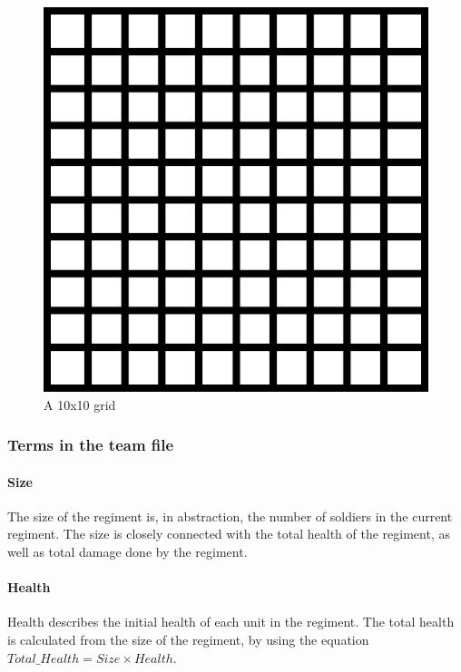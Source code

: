 		\begin{figure}
		\centering
		\includegraphics[scale=0.25]{rapport/2/figures/grid}
		\caption{ A 10x10 grid } \label{fig:grid}
			\end{figure}		
		
																		
		\subsubsection{Terms in the team file }
	
		\paragraph{Size}
		The size of the regiment is, in abstraction, the number of soldiers in the current regiment. 
		The size is closely connected with the total health of the regiment, as well as total damage done by the regiment.

		\paragraph{Health}
		Health describes the initial health of each unit in the regiment.
		The total health is calculated from the size of the regiment, by using the equation\label{Total_Health} $Total\_Health = Size \times Health$.
		
